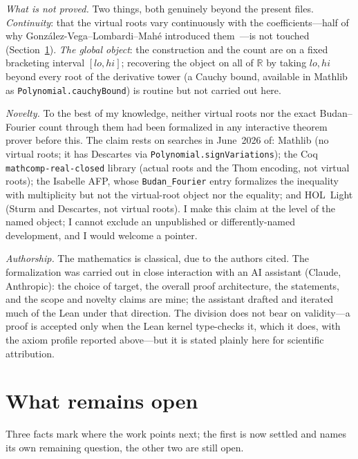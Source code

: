 \documentclass[11pt]{article}
\newcommand{\lean}[1]{\texttt{#1}}
\newcommand{\R}{\mathbb{R}}
\begin{document}
\emph{What is not proved.} Two things, both genuinely beyond the present files. \emph{Continuity}:
that the virtual roots vary continuously with the coefficients---half of why
Gonz\'alez-Vega--Lombardi--Mah\'e introduced them~\cite{glm}---is not touched (Section~\ref{sec:questions}).
\emph{The global object}: the construction and the count are on a fixed bracketing interval $[lo,hi]$;
recovering the object on all of $\R$ by taking $lo,hi$ beyond every root of the derivative tower (a
Cauchy bound, available in Mathlib as \lean{Polynomial.cauchyBound}) is routine but not carried out
here.

\emph{Novelty.} To the best of my knowledge, neither virtual roots nor the exact Budan--Fourier count
through them had been formalized in any interactive theorem prover before this. The claim rests on
searches in June~2026 of: Mathlib (no virtual roots; it has Descartes via
\lean{Polynomial.signVariations}); the Coq \lean{mathcomp-real-closed} library (actual roots and the
Thom encoding, not virtual roots); the Isabelle AFP, whose \lean{Budan\_Fourier} entry formalizes the
inequality with multiplicity but not the virtual-root object nor the equality; and HOL~Light (Sturm and
Descartes, not virtual roots). I make this claim at the level of the named object; I cannot exclude an
unpublished or differently-named development, and I would welcome a pointer.

\emph{Authorship.} The mathematics is classical, due to the authors cited. The formalization was
carried out in close interaction with an AI assistant (Claude, Anthropic): the choice of target, the
overall proof architecture, the statements, and the scope and novelty claims are mine; the assistant
drafted and iterated much of the Lean under that direction. The division does not bear on validity---a
proof is accepted only when the Lean kernel type-checks it, which it does, with the axiom profile
reported above---but it is stated plainly here for scientific attribution.

\section{What remains open}\label{sec:questions}

Three facts mark where the work points next; the first is now settled and names its own remaining
question, the other two are still open.
\end{document}
